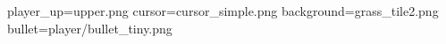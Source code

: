 player_up=upper.png
cursor=cursor_simple.png
background=grass_tile2.png
bullet=player/bullet_tiny.png
